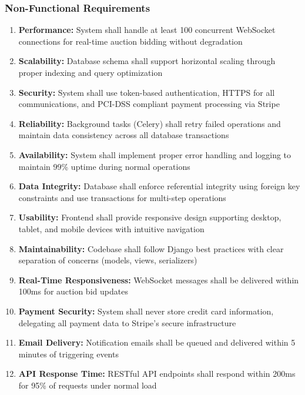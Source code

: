 \documentclass[12pt,a4paper]{article}
\begin{document}
\subsubsection{Non-Functional Requirements}
\begin{enumerate}[leftmargin=*]
    \item \textbf{Performance:} System shall handle at least 100 concurrent WebSocket connections for real-time auction bidding without degradation
    
    \item \textbf{Scalability:} Database schema shall support horizontal scaling through proper indexing and query optimization
    
    \item \textbf{Security:} System shall use token-based authentication, HTTPS for all communications, and PCI-DSS compliant payment processing via Stripe
    
    \item \textbf{Reliability:} Background tasks (Celery) shall retry failed operations and maintain data consistency across all database transactions
    
    \item \textbf{Availability:} System shall implement proper error handling and logging to maintain 99\% uptime during normal operations
    
    \item \textbf{Data Integrity:} Database shall enforce referential integrity using foreign key constraints and use transactions for multi-step operations
    
    \item \textbf{Usability:} Frontend shall provide responsive design supporting desktop, tablet, and mobile devices with intuitive navigation
    
    \item \textbf{Maintainability:} Codebase shall follow Django best practices with clear separation of concerns (models, views, serializers)
    
    \item \textbf{Real-Time Responsiveness:} WebSocket messages shall be delivered within 100ms for auction bid updates
    
    \item \textbf{Payment Security:} System shall never store credit card information, delegating all payment data to Stripe's secure infrastructure
    
    \item \textbf{Email Delivery:} Notification emails shall be queued and delivered within 5 minutes of triggering events
    
    \item \textbf{API Response Time:} RESTful API endpoints shall respond within 200ms for 95\% of requests under normal load
\end{enumerate}
\end{document}
